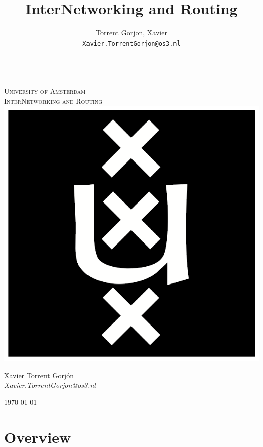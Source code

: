 \documentclass{article}
\author{
  Torrent Gorjon, Xavier\\
  \texttt{Xavier.TorrentGorjon@os3.nl}
}
\title{InterNetworking and Routing}
\begin{document}
\begin{titlepage}
\center
\textsc{}\\[1cm]
\textsc{\LARGE University of Amsterdam}\\[1.5cm]

\textsc{\Large InterNetworking and Routing}\\[0.5cm]

\includegraphics[scale=1]{images/uva.png}\\[3cm]


\begin{minipage}{0.4 \textwidth}
\begin{center}
Xavier Torrent Gorj\'{o}n \\
\emph{Xavier.TorrentGorjon@os3.nl}\\[0.5cm]
\end{center}
\end{minipage}
\hfill

{\large \today} 


\end{titlepage}


\newpage

\tableofcontents

\newpage

\section{Overview}
\end{document}
